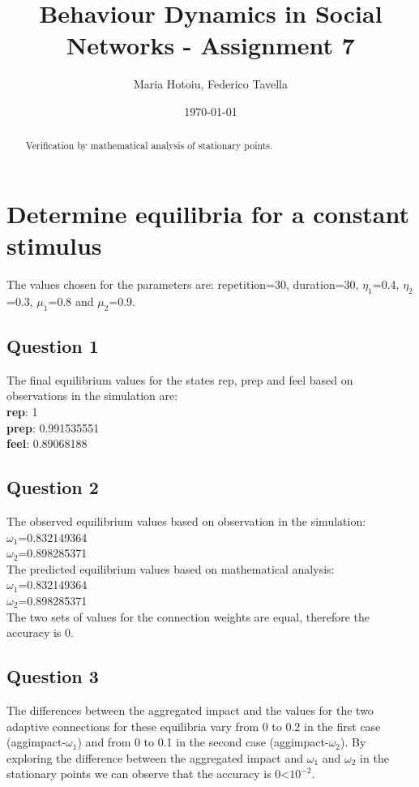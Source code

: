 \documentclass[a4paper]{article}
\title{Behaviour Dynamics in Social Networks - Assignment 7}
\author{Maria Hotoiu, Federico Tavella}
\date{\today}
\begin{document}
\maketitle

\begin{abstract}
Verification by mathematical analysis of stationary points.
\end{abstract}

\section{Determine equilibria for a constant stimulus}

The values chosen for the parameters are: repetition=30, duration=30, $\eta_{1}$=0.4, $\eta_{2}$=0.3, $\mu_{1}$=0.8 and $\mu_{2}$=0.9.

\subsection{Question 1}
The final equilibrium values for the states rep, prep and feel based on observations in the simulation are:\\
\textbf{rep}: 1 \\
\textbf{prep}: 0.991535551	\\
\textbf{feel}: 0.89068188

\subsection{Question 2}

The observed equilibrium values based on observation in the simulation:\\ 
$\omega_{1}$=0.832149364\\
$\omega_{2}$=0.898285371\\

The predicted equilibrium values based on mathematical analysis: \\
$\omega_{1}$=0.832149364\\
$\omega_{2}$=0.898285371\\

The two sets of values for the connection weights are equal, therefore the accuracy is 0.

\subsection{Question 3}

The differences between the aggregated impact and the values for the two adaptive connections for these equilibria vary from 0 to 0.2 in the first case (aggimpact-$\omega_{1}$) and from 0 to 0.1 in the second case (aggimpact-$\omega_{2}$). 
By exploring the difference between the aggregated impact and $\omega_{1}$ and $\omega_{2}$ in the stationary points we can observe that the accuracy is 0<$10^{-2}$. 
\end{document}
